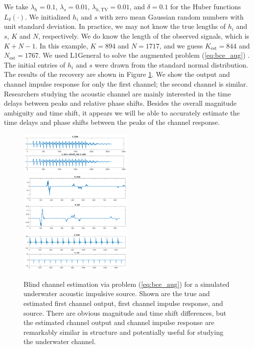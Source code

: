 \documentclass[journal]{IEEEtran}
\begin{document}
We take $\lambda_h = 0.1$, $\lambda_s=0.01$, $\lambda_{h,\text{TV}}=0.01$, and $\delta=0.1$ for the Huber functions $L_\delta(\cdot)$.  We initialized $h_i$ and $s$ with zero mean Gaussian random numbers with unit standard deviation.  In practice, we may not know the true lengths of $h_i$ and $s$, $K$ and $N$, respectively.  We do know the length of the observed signals, which is $K+N-1$.  In this example, $K=894$ and $N=1717$, and we guess $K_\text{est}=844$ and $N_\text{est}=1767$.  We used L1General to solve the augmented problem (\ref{eq:bce_aug}) \cite{schmidt_2010}.  The initial entries of $h_i$ and $s$ were drawn from the standard normal distribution.\\

The results of the recovery are shown in Figure \ref{fig:bce_rec}.  We show the output and channel impulse response for only the first channel; the second channel is similar.  Researchers studying the acoustic channel are mainly interested in the time delays between peaks and relative phase shifts\cite{rideout_2016}.  Besides the overall magnitude ambiguity and time shift, it appears we will be able to accurately estimate the time delays and phase shifts between the peaks of the channel response.

\begin{figure}
   \centering
   \includegraphics[width=0.5\textwidth]{figures/bce_rec_004_x_trim.pdf}
   \includegraphics[width=0.5\textwidth]{figures/bce_rec_004_h_trim.pdf}
   \includegraphics[width=0.5\textwidth]{figures/bce_rec_004_s_trim.pdf}
   \caption{Blind channel estimation via problem (\ref{eq:bce_aug}) for a simulated underwater acoustic impulsive source.  Shown are the true and estimated first channel output, first channel impulse response, and source.  There are obvious magnitude and time shift differences, but the estimated channel output and channel impulse response are remarkably similar in structure and potentially useful for studying the underwater channel.}
   \label{fig:bce_rec}
\end{figure}
\end{document}
